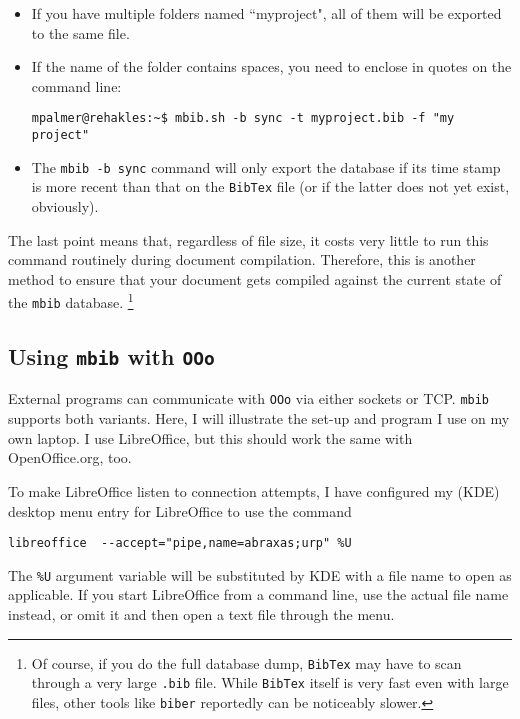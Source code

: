 \documentclass[10pt]{article}
\newcommand*{\mbib}{\texttt{mbib}\xspace}
\newcommand*{\ooo}{\texttt{OOo}\xspace}
\newcommand*{\bibtex}{\texttt{BibTex}\xspace}
\begin{document}
\begin{itemize}
\item If you have multiple folders named ``myproject", all of them will be exported to the same file. 

\item If the name of the folder contains spaces, you need to enclose in quotes on the command line:

\begin{verbatim}
mpalmer@rehakles:~$ mbib.sh -b sync -t myproject.bib -f "my project"
\end{verbatim}

\item The \texttt{\mbib\ -b sync} command will only export the database if its time stamp is more recent than that on the \bibtex file (or if the latter does not yet exist, obviously). 

\end{itemize}

\noindent The last point means that, regardless of file size, it costs very little to run this command routinely during document compilation. Therefore, this is another method to ensure that your document gets compiled against the current state of the \mbib database.%
%
\footnote{Of course, if you do the full database dump, \bibtex may have to scan through a very large \texttt{.bib} file. While \bibtex itself is very fast even with large files, other tools like \texttt{biber} reportedly can be noticeably slower.}

\subsection{Using \mbib with \ooo}

External programs can communicate with \ooo via either sockets or TCP. \mbib supports both variants. Here, I will illustrate the set-up and program I use on my own laptop. I use LibreOffice, but this should work the same with OpenOffice.org, too. 

To make LibreOffice listen to connection attempts, I have configured my (KDE) desktop menu entry for LibreOffice to use the command

\begin{verbatim}
libreoffice  --accept="pipe,name=abraxas;urp" %U
\end{verbatim}

The \texttt{\%U} argument variable will be substituted by KDE with a file name to open as applicable. If you start LibreOffice from a command line, use the actual file name instead, or omit it and then open a text file through the menu. 
\end{document}
